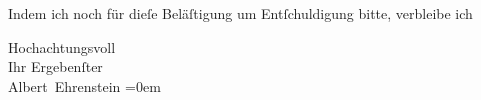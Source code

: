 \pstart
           {\pb}Indem ich noch für dieſe Beläſtigung um
               Entſchuldigung bitte, verbleibe ich\pend
           
\pstart
           Hochachtungsvoll{\\[\baselineskip]}Ihr Ergebenſter{\\[\baselineskip]}\spacefill\mbox{Albert Ehrenstein}\pend
           \leftskip=0em{}\endnumbering{}  
      